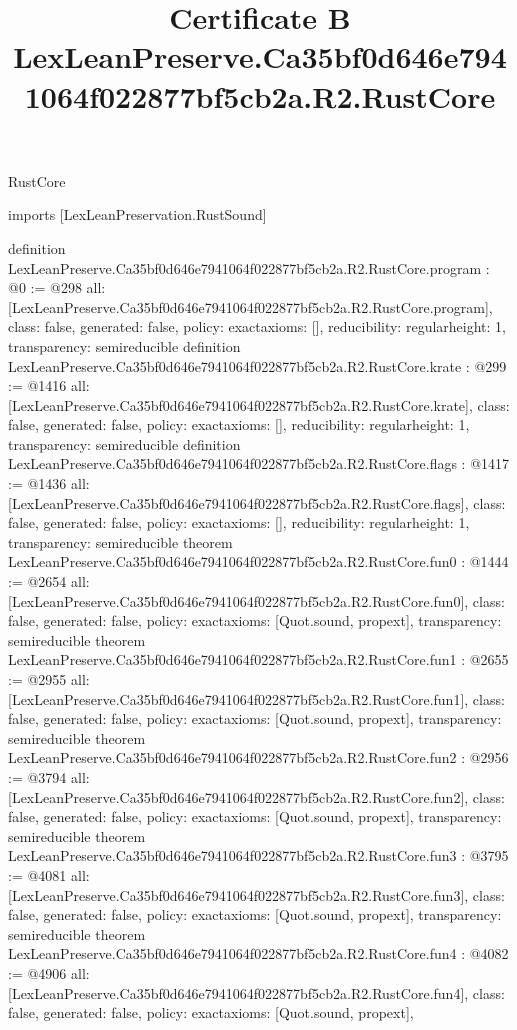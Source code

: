\begin{lexlean}{RustCore}
\title{Certificate B LexLeanPreserve.Ca35bf0d646e7941064f022877bf5cb2a.R2.RustCore}
\begin{coremodule}
imports [LexLeanPreservation.RustSound]

definition LexLeanPreserve.Ca35bf0d646e7941064f022877bf5cb2a.R2.RustCore.program : @0 := @298 {
  all: [LexLeanPreserve.Ca35bf0d646e7941064f022877bf5cb2a.R2.RustCore.program],
  class: false,
  generated: false,
  policy: exact{axioms: []},
  reducibility: regular{height: 1},
  transparency: semireducible
}
definition LexLeanPreserve.Ca35bf0d646e7941064f022877bf5cb2a.R2.RustCore.krate : @299 := @1416 {
  all: [LexLeanPreserve.Ca35bf0d646e7941064f022877bf5cb2a.R2.RustCore.krate],
  class: false,
  generated: false,
  policy: exact{axioms: []},
  reducibility: regular{height: 1},
  transparency: semireducible
}
definition LexLeanPreserve.Ca35bf0d646e7941064f022877bf5cb2a.R2.RustCore.flags : @1417 := @1436 {
  all: [LexLeanPreserve.Ca35bf0d646e7941064f022877bf5cb2a.R2.RustCore.flags],
  class: false,
  generated: false,
  policy: exact{axioms: []},
  reducibility: regular{height: 1},
  transparency: semireducible
}
theorem LexLeanPreserve.Ca35bf0d646e7941064f022877bf5cb2a.R2.RustCore.fun0 : @1444 := @2654 {
  all: [LexLeanPreserve.Ca35bf0d646e7941064f022877bf5cb2a.R2.RustCore.fun0],
  class: false,
  generated: false,
  policy: exact{axioms: [Quot.sound, propext]},
  transparency: semireducible
}
theorem LexLeanPreserve.Ca35bf0d646e7941064f022877bf5cb2a.R2.RustCore.fun1 : @2655 := @2955 {
  all: [LexLeanPreserve.Ca35bf0d646e7941064f022877bf5cb2a.R2.RustCore.fun1],
  class: false,
  generated: false,
  policy: exact{axioms: [Quot.sound, propext]},
  transparency: semireducible
}
theorem LexLeanPreserve.Ca35bf0d646e7941064f022877bf5cb2a.R2.RustCore.fun2 : @2956 := @3794 {
  all: [LexLeanPreserve.Ca35bf0d646e7941064f022877bf5cb2a.R2.RustCore.fun2],
  class: false,
  generated: false,
  policy: exact{axioms: [Quot.sound, propext]},
  transparency: semireducible
}
theorem LexLeanPreserve.Ca35bf0d646e7941064f022877bf5cb2a.R2.RustCore.fun3 : @3795 := @4081 {
  all: [LexLeanPreserve.Ca35bf0d646e7941064f022877bf5cb2a.R2.RustCore.fun3],
  class: false,
  generated: false,
  policy: exact{axioms: [Quot.sound, propext]},
  transparency: semireducible
}
theorem LexLeanPreserve.Ca35bf0d646e7941064f022877bf5cb2a.R2.RustCore.fun4 : @4082 := @4906 {
  all: [LexLeanPreserve.Ca35bf0d646e7941064f022877bf5cb2a.R2.RustCore.fun4],
  class: false,
  generated: false,
  policy: exact{axioms: [Quot.sound, propext]},
}
\end{coremodule}
\end{lexlean}
